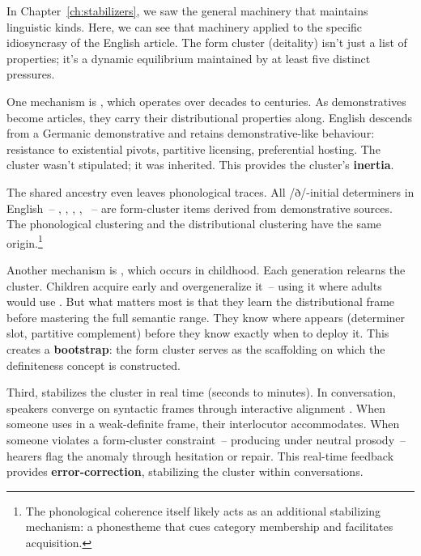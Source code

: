In Chapter~\ref{ch:stabilizers}, we saw the general machinery that maintains linguistic kinds. Here, we can see that machinery applied to the specific idiosyncrasy of the English article. The form cluster (deitality) isn't just a list of properties; it's a dynamic equilibrium maintained by at least five distinct pressures.

One mechanism is , which operates over decades to centuries. As demonstratives become articles, they carry their distributional properties along. English  descends from a Germanic demonstrative and retains demonstrative-like behaviour: resistance to existential pivots, partitive licensing, preferential hosting. The cluster wasn't stipulated; it was inherited. This provides the cluster's \textbf{inertia}.

The shared ancestry even leaves phonological traces. All /ð/-initial determiners in English~-- , , , , ~-- are form-cluster items derived from demonstrative sources. The phonological clustering and the distributional clustering have the same origin.\footnote{The phonological coherence itself likely acts as an additional stabilizing mechanism: a phonestheme that cues category membership and facilitates acquisition.}

Another mechanism is , which occurs in childhood. Each generation relearns the cluster. Children acquire  early and overgeneralize it~-- using it where adults would use  \citep{maratsos1976,rozendaalbaker2008}. But what matters most is that they learn the distributional frame before mastering the full semantic range. They know where  appears (determiner slot, partitive complement) before they know exactly when to deploy it. This creates a \textbf{bootstrap}: the form cluster serves as the scaffolding on which the definiteness concept is constructed.

Third,  stabilizes the cluster in real time (seconds to minutes). In conversation, speakers converge on syntactic frames through interactive alignment \citep{pickering2004}. When someone uses  in a weak-definite frame, their interlocutor accommodates. When someone violates a form-cluster constraint~-- producing  under neutral prosody~-- hearers flag the anomaly through hesitation or repair. This real-time feedback provides \textbf{error-correction}, stabilizing the cluster within conversations.

